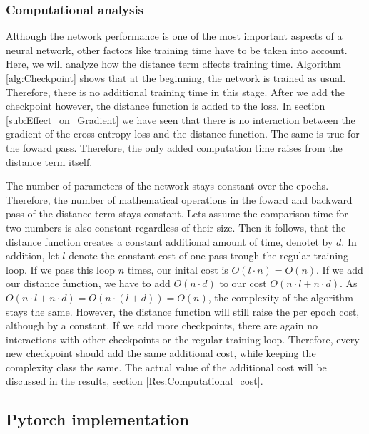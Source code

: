 \subsubsection{Computational analysis}\label{sub:Computational_Analysis}
Although the network performance is one of the most important aspects of a
neural network, other factors like training time have to be taken into account.
Here, we will analyze how the distance term affects training time. Algorithm
\ref{alg:Checkpoint} shows that at the beginning, the network is trained as
usual. Therefore, there is no additional training time in this stage. After we
add the checkpoint however, the distance function is added to the loss. In
section \ref{sub:Effect_on_Gradient} we have seen that there is no interaction
between the gradient of the cross-entropy-loss and the distance function. The
same is true for the foward pass. Therefore, the only added computation time
raises from the distance term itself.

The number of parameters of the network stays constant over the epochs.
Therefore, the number of mathematical operations in the foward and backward pass
of the distance term stays constant. Lets assume the comparison time for two
numbers is also constant regardless of their size. Then it follows, that the
distance function creates a constant additional amount of time, denotet by $d$.
In addition, let $l$ denote the constant cost of one pass trough the regular
training loop. If we pass this loop $n$ times, our inital cost is $O(l\cdot
n)=O(n)$. If we add our distance function, we have to add $O(n\cdot d)$ to our
cost $O(n\cdot l + n \cdot d)$. As $O(n\cdot l + n \cdot d)=O(n\cdot (l +
d))=O(n)$, the complexity of the algorithm stays the same. However, the distance
function will still raise the per epoch cost, although by a constant. If we add
more checkpoints, there are again no interactions with other checkpoints or the
regular training loop. Therefore, every new checkpoint should add the same
additional cost, while keeping the complexity class the same. The actual value
of the additional cost will be discussed in the results, section
\ref{Res:Computational_cost}.


\subsection{Pytorch implementation}\label{sub:Implementation}

